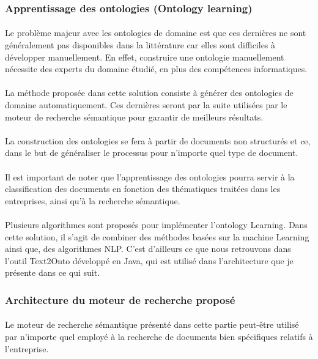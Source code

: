 \documentclass[12pt, a4paper, oneside]{book}
\begin{document}
\subsubsection{Apprentissage des ontologies (Ontology learning) }
\paragraph{}
Le problème majeur avec les ontologies de domaine est que ces dernières ne sont généralement pas disponibles dans la littérature car elles sont difficiles à développer manuellement. En effet, construire une ontologie manuellement nécessite des experts du domaine étudié, en plus des compétences informatiques. 
\paragraph{}
La méthode proposée dans cette solution consiste à générer des ontologies de domaine automatiquement. Ces dernières seront par la suite utilisées par le moteur de recherche sémantique pour garantir de meilleurs résultats.
\paragraph{}
La construction des ontologies se fera à partir de documents non structurés et ce, dans le but de généraliser le processus pour n'importe quel type de document.
\paragraph{}
Il est important de noter que l'apprentissage des ontologies pourra servir à la classification des documents en fonction des thématiques traitées dans les entreprises, ainsi qu'à la recherche sémantique.
\paragraph{}
Plusieurs algorithmes sont proposés pour implémenter l'ontology Learning. 
Dans cette solution, il s'agit de combiner des méthodes basées sur la machine Learning ainsi que, des algorithmes NLP. C'est d'ailleurs ce que nous retrouvons dans l'outil Text2Onto développé en Java, qui est utilisé dans l'architecture que je présente dans ce qui suit.

\subsubsection{Architecture du moteur de recherche proposé}
\paragraph{}
Le moteur de recherche sémantique présenté dans cette partie peut-être utilisé par n'importe quel employé à la recherche de documents bien spécifiques relatifs à l'entreprise.
\end{document}
